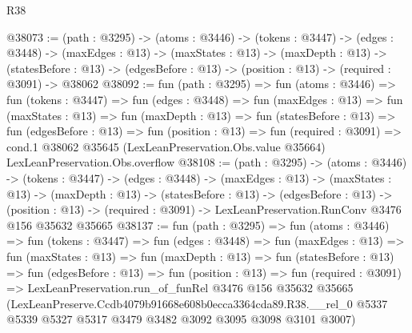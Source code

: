 \begin{lexlean}{R38}
\begin{coremodule}
@38073 := (path : @3295) ->
  (atoms : @3446) ->
  (tokens : @3447) ->
  (edges : @3448) ->
  (maxEdges : @13) ->
  (maxStates : @13) ->
  (maxDepth : @13) ->
  (statesBefore : @13) -> (edgesBefore : @13) -> (position : @13) -> (required : @3091) -> @38062
@38092 := fun (path : @3295) =>
  fun (atoms : @3446) =>
  fun (tokens : @3447) =>
  fun (edges : @3448) =>
  fun (maxEdges : @13) =>
  fun (maxStates : @13) =>
  fun (maxDepth : @13) =>
  fun (statesBefore : @13) =>
  fun (edgesBefore : @13) =>
  fun (position : @13) =>
  fun (required : @3091) =>
  cond.{1} @38062 @35645 (LexLeanPreservation.Obs.value @35664) LexLeanPreservation.Obs.overflow
@38108 := (path : @3295) ->
  (atoms : @3446) ->
  (tokens : @3447) ->
  (edges : @3448) ->
  (maxEdges : @13) ->
  (maxStates : @13) ->
  (maxDepth : @13) ->
  (statesBefore : @13) ->
  (edgesBefore : @13) ->
  (position : @13) -> (required : @3091) -> LexLeanPreservation.RunConv @3476 @156 @35632 @35665
@38137 := fun (path : @3295) =>
  fun (atoms : @3446) =>
  fun (tokens : @3447) =>
  fun (edges : @3448) =>
  fun (maxEdges : @13) =>
  fun (maxStates : @13) =>
  fun (maxDepth : @13) =>
  fun (statesBefore : @13) =>
  fun (edgesBefore : @13) =>
  fun (position : @13) =>
  fun (required : @3091) =>
  LexLeanPreservation.run_of_funRel
    @3476
    @156
    @35632
    @35665
    (LexLeanPreserve.Ccdb4079b91668e608b0ecca3364cda89.R38.__rel_0
      @5337
      @5339
      @5327
      @5317
      @3479
      @3482
      @3092
      @3095
      @3098
      @3101
      @3007)
\end{coremodule}
\end{lexlean}
